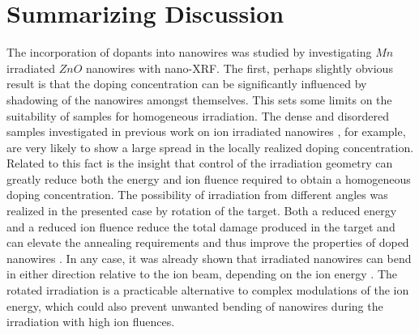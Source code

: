 \section{Summarizing Discussion}

The incorporation of dopants into nanowires was studied by investigating $Mn$ irradiated $ZnO$ nanowires with nano-XRF. The first, perhaps slightly obvious result is that the doping concentration can be significantly influenced by shadowing of the nanowires amongst themselves. This sets some limits on the suitability of samples for homogeneous irradiation. The dense and disordered samples investigated in previous work on ion irradiated nanowires \cite{geburt_rare_2008,ronning_ion_2010,kaiser_defect_2011,geburt_lasing_2012,geburt_intense_2013,kaiser_luminescence_2013,geburt_intense_2014,chu_nano-x-ray_2014}, for example, are very likely to show a large spread in the locally realized doping concentration. Related to this fact is the insight that control of the irradiation geometry can greatly reduce both the energy and ion fluence required to obtain a homogeneous doping concentration. The possibility of irradiation from different angles was realized in the presented case by rotation of the target. Both a reduced energy and a reduced ion fluence reduce the total damage produced in the target and can elevate the annealing requirements and thus improve the properties of doped nanowires \cite{borschel_new_2011,paschoal_hopping_2012,borschel_ion-solid_2012,kumar_magnetic_2013,paschoal_magnetoresistance_2014}. In any case, it was already shown that irradiated nanowires can bend in either direction relative to the ion beam, depending on the ion energy \cite{borschel_permanent_2011}. The rotated irradiation is a practicable alternative to complex modulations of the ion energy, which could also prevent unwanted bending of nanowires during the irradiation with high ion fluences.

